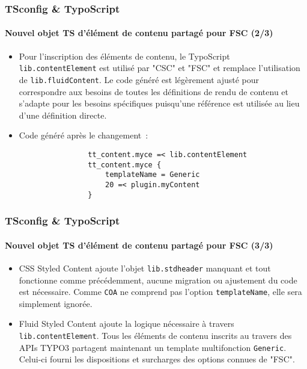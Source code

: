 
\begin{frame}[fragile]
	\frametitle{TSconfig \& TypoScript}
	\framesubtitle{Nouvel objet TS d'élément de contenu partagé pour FSC (2/3)}

	\begin{itemize}
		\item Pour l'inscription des éléments de contenu, le TypoScript \texttt{lib.contentElement}
			est utilisé par "CSC" et "FSC" et remplace l'utilisation de \texttt{lib.fluidContent}.
			Le code généré est légèrement ajusté pour correspondre aux besoins de toutes les
			définitions de rendu de contenu et s'adapte pour les besoins spécifiques puisqu'une
			référence est utilisée au lieu d'une définition directe.

		\item Code généré après le changement~:

			\begin{lstlisting}
				tt_content.myce =< lib.contentElement
				tt_content.myce {
				    templateName = Generic
				    20 =< plugin.myContent
				}
			\end{lstlisting}
	\end{itemize}

\end{frame}


\begin{frame}[fragile]
	\frametitle{TSconfig \& TypoScript}
	\framesubtitle{Nouvel objet TS d'élément de contenu partagé pour FSC (3/3)}

	\begin{itemize}
		\item CSS Styled Content ajoute l'objet \texttt{lib.stdheader} manquant et tout fonctionne
			comme précédemment, aucune migration ou ajustement du code est nécessaire. Comme
			\texttt{COA} ne comprend pas l'option \texttt{templateName}, elle sera simplement ignorée.

		\item Fluid Styled Content ajoute la logique nécessaire à travers \texttt{lib.contentElement}.
			Tous les éléments de contenu inscrits au travers des APIs TYPO3 partagent maintenant un
			template multifonction \texttt{Generic}. Celui-ci fourni les dispositions et surcharges des
			options connues de "FSC".

	\end{itemize}
\end{frame}

